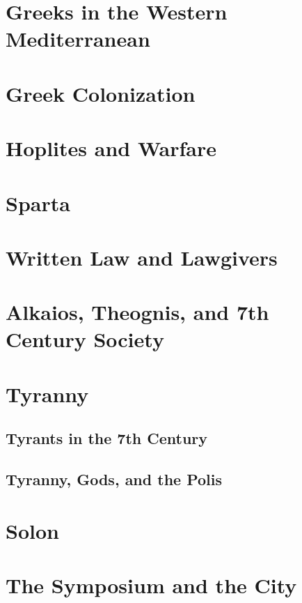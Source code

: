 \documentclass[a4paper]{article}
\begin{document}
\section{Greeks in the Western Mediterranean}

\section{Greek Colonization}

\section{Hoplites and Warfare}

\section{Sparta}

\section{Written Law and Lawgivers}

\section{Alkaios, Theognis, and 7th Century Society}

\section{Tyranny}

\subsection{Tyrants in the 7th Century}

\subsection{Tyranny, Gods, and the Polis}

\section{Solon}

\section{The Symposium and the City}
\end{document}
